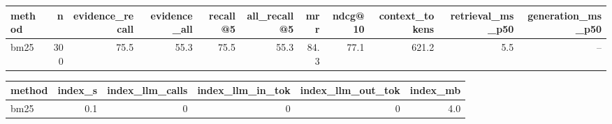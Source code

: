 \begin{tabular}{lrrrrrrrrrr}
\toprule
method & n & evidence\_recall & evidence\_all & recall@5 & all\_recall@5 & mrr & ndcg@10 & context\_tokens & retrieval\_ms\_p50 & generation\_ms\_p50 \\
\midrule
bm25 & 300 & 75.5 & 55.3 & 75.5 & 55.3 & 84.3 & 77.1 & 621.2 & 5.5 & -- \\
\bottomrule
\end{tabular}

\begin{tabular}{lrrrrr}
\toprule
method & index\_s & index\_llm\_calls & index\_llm\_in\_tok & index\_llm\_out\_tok & index\_mb \\
\midrule
bm25 & 0.1 & 0 & 0 & 0 & 4.0 \\
\bottomrule
\end{tabular}
